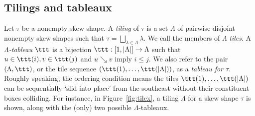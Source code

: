 \subsection{Tilings and tableaux}\label{tilingsec}
Let \(\tau\) be a nonempty skew shape. A {\em tiling} of \(\tau\) is a set \(\Lambda\) of pairwise disjoint nonempty skew shapes such that \(\tau = \bigsqcup_{\lambda \in \Lambda} \lambda\). We call the members of \(\Lambda\) {\em tiles}.
A {\em \(\Lambda\)-tableau} \(\ttt\) is a bijection \(\ttt: [1, |\Lambda|] \to \Lambda\) such that \(u \in \ttt(i), v \in \ttt(j)\) and \(u \searrow v\) imply \(i\leq j\). We also refer to the pair \((\Lambda, \ttt)\), or the tile sequence \((\ttt(1), \ldots, \ttt(|\Lambda|))\), as a {\em tableau for \(\tau\)}.
Roughly speaking, the ordering condition means the tiles \(\ttt(1), \ldots, \ttt(|\Lambda|)\) can be sequentially `slid into place' from the southeast without their constituent boxes colliding. For instance, in Figure~\ref{fig:tilex}, a tiling \(\Lambda\) for a skew shape \(\tau\) is shown, along with the (only) two possible \(\Lambda\)-tableaux. 

